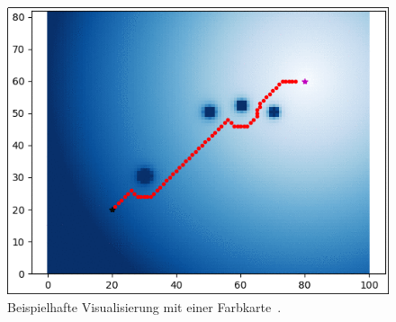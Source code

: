 \begin{figure}
  \centering
  \includegraphics[width=0.7\linewidth, height=0.7\linewidth]{img/pythonrobotics}
  \caption{Beispielhafte Visualisierung mit einer Farbkarte~\cite{PythonRobotics}.}
  \label{fig:other_pyrob}
\end{figure}

